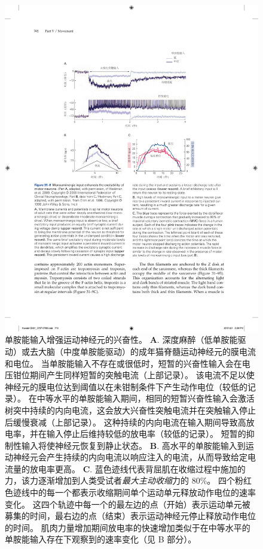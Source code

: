 \begin{figure}[htbp]
	\centering
	\includegraphics[width=0.85\linewidth]{chap31/fig_31_8}
	\caption{单胺能输入增强运动神经元的兴奋性\cite{heckman2009motoneuron,erim1996rank}。
	\textbf{A}. 深度麻醉（低单胺能驱动）或去大脑（中度单胺能驱动）的成年猫脊髓运动神经元的膜电流和电位。
	当单胺能输入不存在或很低时，短暂的兴奋性输入会在电压钳位期间产生同样短暂的突触电流（上部记录）。
	该电流不足以使神经元的膜电位达到阈值以在未钳制条件下产生动作电位（较低的记录）。
	在中等水平的单胺能输入期间，相同的短暂兴奋性输入会激活树突中持续的内向电流，这会放大兴奋性突触电流并在突触输入停止后缓慢衰减（上部记录）。
	这种持续的内向电流在输入期间导致高放电率，并在输入停止后维持较低的放电率（较低的记录）。
	短暂的抑制性输入将使神经元恢复到静止状态。
	\textbf{B}. 高水平的单胺能输入到运动神经元会产生持续的内向电流以响应注入的电流，从而导致给定电流量的放电率更高。
	\textbf{C}. 蓝色迹线代表背屈肌在收缩过程中施加的力，该力逐渐增加到人类受试者\textit{最大主动收缩}力的 80\%。
	四个粉红色迹线中的每一个都表示收缩期间单个运动单元释放动作电位的速率变化。 
	这四个轨迹中每一个的最左边的点（开始）表示运动单元被募集的时间，最右边的点（结束）表示运动神经元停止释放动作电位的时间。
	肌肉力量增加期间放电率的快速增加类似于在中等水平的单胺能输入存在下观察到的速率变化（见 B 部分）。}
	\label{fig:31_8}
\end{figure}


